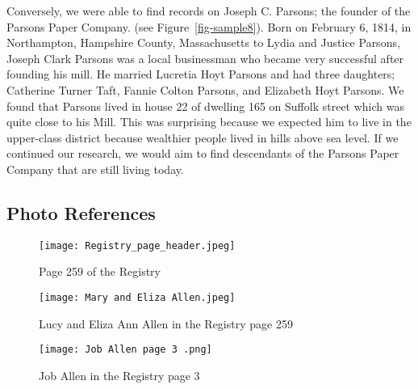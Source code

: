 \documentclass[
  letterpaper,
  DIV=11,
  numbers=noendperiod]{scrartcl}
\begin{document}
\newpage{}

Conversely, we were able to find records on Joseph C. Parsons; the
founder of the Parsons Paper Company. (see Figure~\ref{fig-sample8}).
Born on February 6, 1814, in Northampton, Hampshire County,
Massachusetts to Lydia and Justice Parsons, Joseph Clark Parsons was a
local businessman who became very successful after founding his mill. He
married Lucretia Hoyt Parsons and had three daughters; Catherine Turner
Taft, Fannie Colton Parsons, and Elizabeth Hoyt Parsons. We found that
Parsons lived in house 22 of dwelling 165 on Suffolk street which was
quite close to his Mill. This was surprising because we expected him to
live in the upper-class district because wealthier people lived in hills
above sea level. If we continued our research, we would aim to find
descendants of the Parsons Paper Company that are still living today.

\newpage{}

\hypertarget{photo-references}{%
\subsection{Photo References}\label{photo-references}}

\begin{figure}

{\centering \texttt{[image: Registry\_page\_header.jpeg]}

}

\caption{\label{fig-sample1}Page 259 of the Registry}

\end{figure}

\begin{figure}

{\centering \texttt{[image: Mary and Eliza Allen.jpeg]}

}

\caption{\label{fig-sample2}Lucy and Eliza Ann Allen in the Registry
page 259}

\end{figure}

\begin{figure}

{\centering \texttt{[image: Job Allen page 3 .png]}

}

\caption{\label{fig-sample3}Job Allen in the Registry page 3}

\end{figure}
\end{document}
